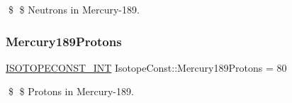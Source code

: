 \$ \$ Neutrons in Mercury-\/189. \mbox{\label{group___isotope_const-_mercury-_hg189_ga3cd0b5d7d0e6031ff024766450311b26}} 
\subsubsection{\texorpdfstring{Mercury189\+Protons}{Mercury189Protons}}
{\footnotesize\ttfamily \mbox{\hyperlink{group___isotope_const-_macros_ga5f18360b3e99483a35c32d789e62621c}{I\+S\+O\+T\+O\+P\+E\+C\+O\+N\+S\+T\+\_\+\+I\+NT}} Isotope\+Const\+::\+Mercury189\+Protons = 80}

\$ \$ Protons in Mercury-\/189. 